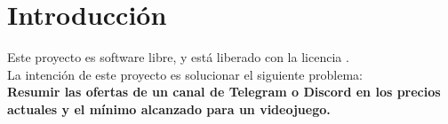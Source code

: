 \chapter{Introducción}

Este proyecto es software libre, y está liberado con la licencia \cite{gplv3}.\\

La intención de este proyecto es solucionar el siguiente problema:\\

\textbf{Resumir las ofertas de un canal de Telegram o Discord en los precios actuales y el mínimo alcanzado para un videojuego.}\\
